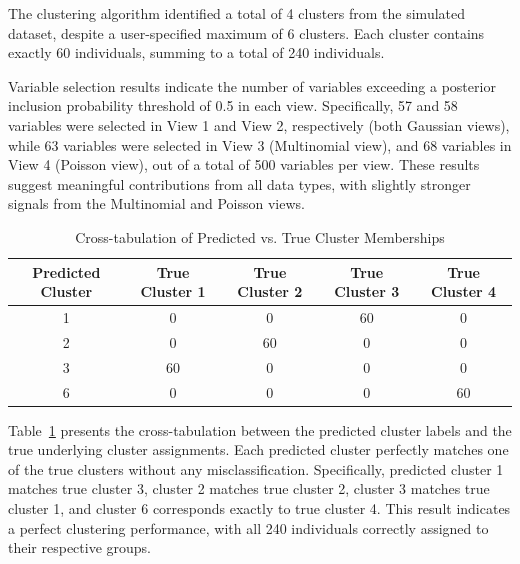 The clustering algorithm identified a total of 4 clusters from the simulated dataset,
 despite a user-specified maximum of 6 clusters. Each cluster contains exactly 60 individuals,
  summing to a total of 240 individuals.

Variable selection results indicate the number of variables exceeding a posterior inclusion
probability threshold of 0.5 in each view. Specifically, 57 and 58 variables were selected in
View 1 and View 2, respectively (both Gaussian views), while 63 variables were selected in View 3
(Multinomial view), and 68 variables in View 4 (Poisson view), out of a total of 500 variables per view.
These results suggest meaningful contributions from all data types, with slightly stronger signals
from the Multinomial and Poisson views.

\begin{table}[!h]
  \centering
  \caption{Cross-tabulation of Predicted vs. True Cluster Memberships}
  \label{tab:confusion_matrix}
  \begin{tabular}{ccccc}
  \toprule
  \textbf{Predicted Cluster} & \textbf{True Cluster 1} & \textbf{True Cluster 2} & \textbf{True Cluster 3} & \textbf{True Cluster 4} \\
  \midrule
  1 & 0 & 0 & 60 & 0 \\
  2 & 0 & 60 & 0 & 0 \\
  3 & 60 & 0 & 0 & 0 \\
  6 & 0 & 0 & 0 & 60 \\
  \bottomrule
\end{tabular}
\end{table}

Table~\ref{tab:confusion_matrix} presents the cross-tabulation between the predicted cluster 
labels and the true underlying cluster assignments. Each predicted cluster perfectly matches 
one of the true clusters without any misclassification. Specifically, predicted cluster 1 matches
 true cluster 3, cluster 2 matches true cluster 2, cluster 3 matches true cluster 1, and cluster 
 6 corresponds exactly to true cluster 4. This result indicates a perfect clustering performance, 
with all 240 individuals correctly assigned to their respective groups.

